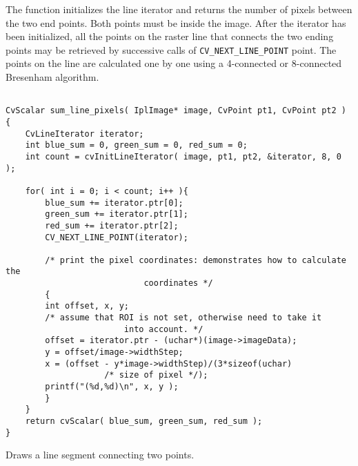 \begin{description}
\end{description}

The function initializes the line
iterator and returns the number of pixels between the two end points.
Both points must be inside the image. After the iterator has been
initialized, all the points on the raster line that connects the
two ending points may be retrieved by successive calls of
\texttt{CV\_NEXT\_LINE\_POINT} point. The points on the line are
calculated one by one using a 4-connected or 8-connected Bresenham
algorithm.

\ifC
{}

\begin{lstlisting}

CvScalar sum_line_pixels( IplImage* image, CvPoint pt1, CvPoint pt2 )
{
    CvLineIterator iterator;
    int blue_sum = 0, green_sum = 0, red_sum = 0;
    int count = cvInitLineIterator( image, pt1, pt2, &iterator, 8, 0 );

    for( int i = 0; i < count; i++ ){
        blue_sum += iterator.ptr[0];
        green_sum += iterator.ptr[1];
        red_sum += iterator.ptr[2];
        CV_NEXT_LINE_POINT(iterator);

        /* print the pixel coordinates: demonstrates how to calculate the 
							coordinates */
        {
        int offset, x, y;
        /* assume that ROI is not set, otherwise need to take it 
						into account. */
        offset = iterator.ptr - (uchar*)(image->imageData);
        y = offset/image->widthStep;
        x = (offset - y*image->widthStep)/(3*sizeof(uchar) 
					/* size of pixel */);
        printf("(%d,%d)\n", x, y );
        }
    }
    return cvScalar( blue_sum, green_sum, red_sum );
}

\end{lstlisting}
\fi

Draws a line segment connecting two points.

